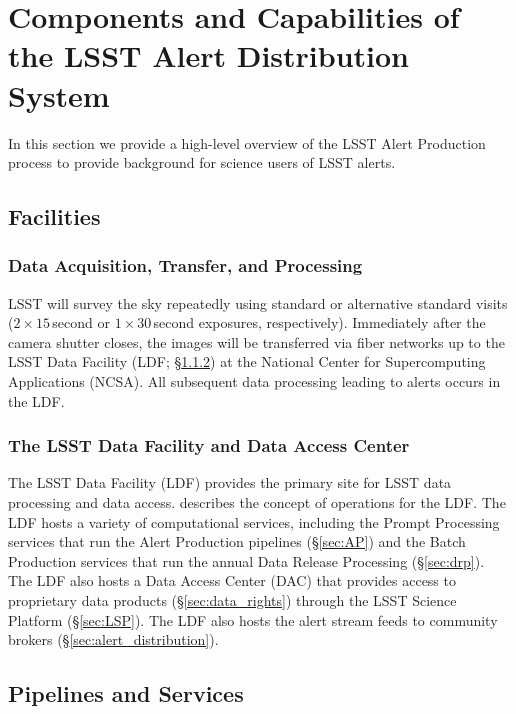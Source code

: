 \section{Components and Capabilities of the LSST Alert Distribution System}\label{sec:components}

In this section we provide a high-level overview of the LSST Alert Production process to provide background for science users of LSST alerts.

\subsection{Facilities}

\subsubsection{Data Acquisition, Transfer, and Processing}

LSST will survey the sky repeatedly using standard or alternative standard visits ($2\times15$\,second or $1\times30$\,second exposures, respectively).  
Immediately after the camera shutter closes, the images will be transferred via fiber networks up to the LSST Data Facility (LDF; \S \ref{sec:LDF}) at the National Center for Supercomputing Applications (NCSA).
All subsequent data processing leading to alerts occurs in the LDF.

\subsubsection{The LSST Data Facility and Data Access Center} \label{sec:LDF}

The LSST Data Facility (LDF) provides the primary site for LSST data processing and data access.
 describes the concept of operations for the LDF.
The LDF hosts a variety of computational services, including the Prompt Processing services that run the Alert Production pipelines (\S \ref{sec:AP}) and the Batch Production services that run the annual Data Release Processing (\S \ref{sec:drp}). 
The LDF also hosts a Data Access Center (DAC) that provides access to proprietary data products (\S \ref{sec:data_rights}) through the LSST Science Platform (\S \ref{sec:LSP}).
The LDF also hosts the alert stream feeds to community brokers (\S \ref{sec:alert_distribution}).

\subsection{Pipelines and Services}


